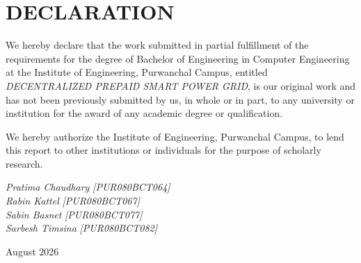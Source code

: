 \chapter*{DECLARATION}


We hereby declare that the work submitted in partial fulfillment of the
requirements for the degree of Bachelor of Engineering in Computer Engineering
at the Institute of Engineering, Purwanchal Campus, entitled
\textit{DECENTRALIZED PREPAID SMART POWER GRID}, is our original work and has
not been previously submitted by us, in whole or in part, to any university
or institution for the award of any academic degree or qualification.

We hereby authorize the Institute of Engineering, Purwanchal Campus, to lend
this report to other institutions or individuals for the purpose of scholarly
research.

\vspace{1.5cm}

\textit{Pratima Chaudhary}
\textit{[PUR080BCT064]}\\
\textit{Rabin Kattel}
\textit{[PUR080BCT067]}\\
\textit{Sabin Basnet}   
\textit{[PUR080BCT077]}\\  
\textit{Sarbesh Timsina}
\textit{[PUR080BCT082]}

\vspace{2cm}

August 2026

\clearpage